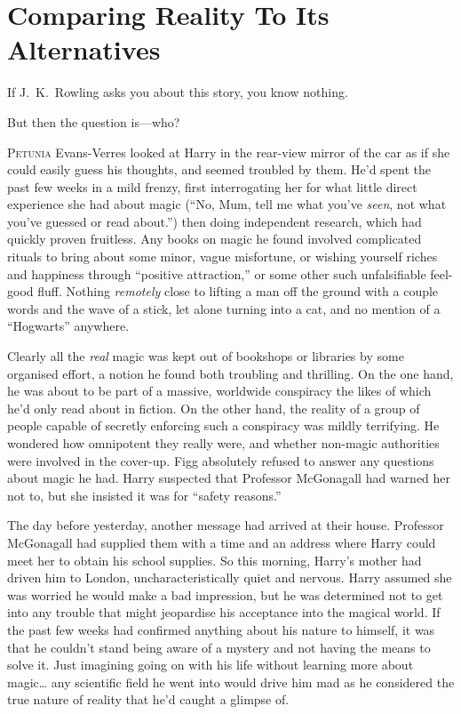
\chapter{Comparing Reality To Its Alternatives}

\begin{chapterOpeningAuthorNote}
If J.~K.~Rowling asks you about this story, you know nothing.
\end{chapterOpeningAuthorNote}
\begin{chapterOpeningQuote}
But then the question is—who?
\end{chapterOpeningQuote}

\lettrine{P}{etunia} Evans-Verres looked at Harry in the rear-view
mirror of the car as if she could easily guess his thoughts,
and seemed troubled by them. He’d spent the past few
weeks in a mild frenzy, first interrogating her for what little
direct experience she had about magic (“No, Mum, tell me
what you’ve \emph{seen}, not what you’ve guessed or read
about.”) then doing independent research, which had
quickly proven fruitless. Any books on magic he found
involved complicated rituals to bring about some minor,
vague misfortune, or wishing yourself riches and happiness
through “positive attraction,” or some other such
unfalsifiable feel-good fluff. Nothing \emph{remotely} close to lifting
a man off the ground with a couple words and the wave
of a stick, let alone turning into a cat, and no mention of
a “Hogwarts” anywhere.

Clearly all the \emph{real} magic was kept out of bookshops or
libraries by some organised effort, a notion he found both
troubling and thrilling. On the one hand, he was about to
be part of a massive, worldwide conspiracy the likes of
which he’d only read about in fiction. On the other hand,
the reality of a group of people capable of secretly
enforcing such a conspiracy was mildly terrifying. He
wondered how omnipotent they really were, and whether
non-magic authorities were involved in the cover-up.
Figg absolutely refused to answer any questions about magic
he had. Harry suspected that Professor McGonagall had warned her not to,
but she insisted it was for “safety reasons.”

The day before yesterday, another message had
arrived at their house. Professor McGonagall had supplied
them with a time and an address where Harry could meet
her to obtain his school supplies. So this morning, Harry’s
mother had driven him to London, uncharacteristically quiet
and nervous. Harry assumed she was worried he would
make a bad impression, but he was determined not to get
into any trouble that might jeopardise his acceptance into
the magical world. If the past few weeks had confirmed
anything about his nature to himself, it was that he
couldn’t stand being aware of a mystery and not having
the means to solve it. Just imagining going on with his life
without learning more about magic… any scientific field he
went into would drive him mad as he considered the true
nature of reality that he’d caught a glimpse of.

